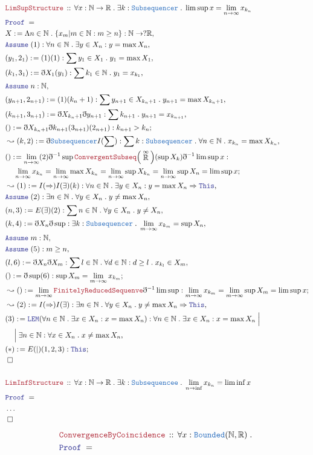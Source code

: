 \documentclass[12pt]{scrartcl}
\newcommand{\TYPE}[1]{\textcolor{NavyBlue}{\mathtt{#1}}}
\newcommand{\LOGIC}[1]{\textcolor{Blue}{\mathtt{#1}}}
\newcommand{\THM}[1]{\textcolor{Maroon}{\mathtt{#1}}}
\renewcommand{\.}{\; . \;}
\newcommand{\de}{: \kern 0.1pc =}
\newcommand{\Theorem}[2]{& \THM{#1} \, :: \, #2 \\ & \Proof = \\ }
\newcommand{\NewLine}{\\ & \kern 1pc}
\newcommand{\Page}[1]{ \begin{align*} #1 \end{align*}   }
\newcommand{ \bd }{ \ByDef }
\newcommand{\NoProof}{ & \ldots \\ \EndProof}
\newcommand{\Reals}{\mathbb{R} }
\newcommand{\Nat}{\mathbb{N} }
\newcommand{\EReals}{\stackrel{\mathclap{\infty}}{\mathbb{R}}}
\newcommand{\Say}[3]{& #1 \de #2 : #3, \\}
\newcommand{\Conclude}[3]{& #1 \de #2 : #3; \\}
\newcommand{\Derive}[3]{& \leadsto #1 \de #2 : #3, \\}
\newcommand{\DeriveConclude}[3]{& \leadsto #1 \de #2 : #3 ; \\}
\newcommand{\Assume}[2]{& \LOGIC{Assume} \;#1 : #2, \\}
\newcommand{\QED}{\; \square}
\newcommand{\EndProof}{& \QED \\}
\newcommand{\ByDef}{\eth}
\newcommand{\Proof}{\LOGIC{Proof} \; }
\begin{document}
\Page{
	\Theorem{LimSupStructure}{\forall x : \Nat \to \Reals \. \exists k : \TYPE{Subsequencer} \. 
		\lim \sup x = \lim_{n \to \infty} x_{k_n}}
	\Say{X}{\Lambda n \in \Nat \. \{ x_m | m \in \Nat : m \ge n\}}{ \Nat \to ?\Reals }
	\Assume{(1)}{\forall n \in \Nat \. \exists y \in X_n : y = \max X_n}
	\Say{(y_1,2_1)}{(1)(1)}{\sum y_1 \in X_1 \. y_1 = \max X_1}
	\Say{(k_1,3_1)}{\bd X_1(y_1)}{\sum k_1 \in \Nat \. y_1 = x_{k_1}}
	\Assume{n}{\Nat}
	\Say{(y_{n +1},2_{n+1})}{ (1)(k_{n} + 1)  }{\sum y_{n+1} \in X_{k_n + 1} \. y_{n +1} = \max X_{k_n + 1}}
	\Say{(k_{n+1},3_{n+1})}{\bd X_{k_n + 1} \bd y_{n + 1}  }{ \sum k_{n + 1} \. y_{n + 1} = x_{k_{n +1}}}
	\Conclude{()}{ \bd X_{k_n + 1} \bd k_{n + 1}(3_{n +1})(2_{n + 1})}{ k_{n + 1} > k_{n}  }
	\Derive{(k,2) }{\bd \TYPE{Subsequencer} I(\sum)}{\sum k : \TYPE{Subsequencer} \. \forall n \in \Nat \. 
	x_{k_n} = \max X_{k_n}}
	\Conclude{()}{ \lim_{n \to \infty}  (2)  \bd^{-1} \sup  \THM{ConvergentSubseq}\Big(\EReals\Big)
		(\sup X_k)\bd^{-1} \lim \sup x}{ 
		\NewLine
		\lim_{n \to \infty} x_{k_n} = \lim_{n \to \infty} \max X_{k_n} = \lim_{n \to \infty} \sup X_{k_n} 
		= \lim_{n \to \infty} \sup X_{n} = \lim \sup x
	}
	\Derive{(1)}{I(\Rightarrow)I(\exists)(k)}{\forall n \in \Nat \. \exists y \in X_n :  y = \max X_n 
	\Rightarrow \LOGIC{This} }
	\Assume{(2)}{\exists n \in \Nat \. \forall y \in X_n \. y \neq \max X_n}
	\Say{(n,3)}{E(\exists)(2)}{\sum n \in \Nat \. \forall y \in X_n \. y \neq X_n}
	\Say{(k,4)}{\bd X_n \bd \sup}{ \exists k : \TYPE{Subsequencer} \. \lim_{m \to \infty } x_{k_m} = \sup X_n}
	\Assume{m}{\Nat}
	\Assume{(5)}{m \ge n}
	\Say{(l,6)}{\bd X_n \bd X_m}{ \sum l \in \Nat \. \forall d \in \Nat : d \ge l \. x_{k_l} \in X_m}
	\Conclude{()}{\bd \sup (6)}{ \sup X_m = \lim_{m \to \infty} x_{k_m}}
	\DeriveConclude{()}{\lim_{m \to \infty} \THM{FinitelyReducedSequenve} \bd^{-1} \lim \sup}{ 
		\lim_{m \to \infty} x_{k_m} =  \lim_{m \to \infty} \sup X_{m} = \lim \sup x       }
	\Derive{(2)}{I(\Rightarrow)I(\exists)}{ \exists n \in \Nat \. \forall y \in X_n \. y \neq \max X_n 
		\Rightarrow \LOGIC{This}}
	\Say{(3)}{\LOGIC{LEM}(\forall n \in \Nat \. \exists x \in X_n : x = \max X_n)}
	{ \forall n \in \Nat \. \exists x \in X_n : x = \max X_n \; \Big| \NewLine \Big| \; 
	  \exists n \in \Nat :  \forall x \in X_n \. x \neq \max X_n 
	}
	\Conclude{(*)}{E(|)(1,2,3)}{\LOGIC{This}}
	\EndProof
	\\
	\Theorem{LimInfStructure}{\forall x : \Nat \to \Reals \. \exists k : \TYPE{Subsequencee} \.
           	\lim_{n \to \inf} x_{k_n} = \lim \inf x	}
	\NoProof
}\Page{
	\Theorem{ConvergenceByCoincidence}{\forall x : \TYPE{Bounded}(\Nat,\Reals) \.
}}
\end{document}
